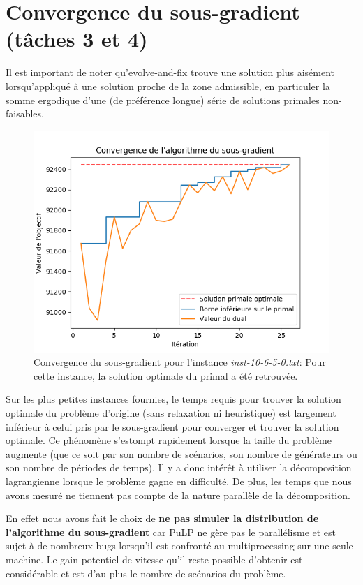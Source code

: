 \section{Convergence du sous-gradient (tâches 3 et 4)}

Il est important de noter qu'evolve-and-fix trouve une solution plus aisément lorsqu'appliqué
à une solution proche de la zone admissible, en particuler la somme ergodique d'une (de préférence
longue) série de solutions primales non-faisables.

\begin{figure}[h!]
\begin{center}
    \includegraphics[width=.5\textwidth]{imgs/subgradient}
    \caption{Convergence du sous-gradient pour l'instance \textit{inst-10-6-5-0.txt}:
    Pour cette instance, la solution optimale du primal a été retrouvée.}
\end{center}
\end{figure}

Sur les plus petites instances fournies, le temps requis pour trouver la solution optimale du problème
d'origine (sans relaxation ni heuristique) est largement inférieur à celui pris par le sous-gradient
pour converger et trouver la solution optimale. Ce phénomène s'estompt rapidement lorsque la taille
du problème augmente (que ce soit par son nombre de scénarios, son nombre de générateurs ou son nombre
de périodes de temps). Il y a donc intérêt à utiliser la décomposition lagrangienne lorsque le problème
gagne en difficulté. De plus, les temps que nous avons mesuré ne tiennent pas compte de la nature
parallèle de la décomposition.

En effet nous avons fait le choix de \textbf{ne pas simuler la distribution de l'algorithme du sous-gradient}
car PuLP ne gère pas le parallélisme et est sujet à de nombreux bugs lorsqu'il est confronté au multiprocessing
sur une seule machine. Le gain potentiel de vitesse qu'il reste possible d'obtenir est considérable et est
d'au plus le nombre de scénarios du problème.

